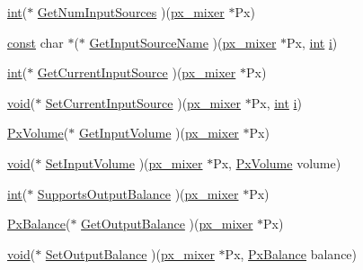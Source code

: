 \begin{DoxyCompactItemize}
\item 
\hyperlink{xmltok_8h_a5a0d4a5641ce434f1d23533f2b2e6653}{int}($\ast$ \hyperlink{structpx__mixer_ab1f16463c72c741b58312db36a7af2e1}{Get\+Num\+Input\+Sources} )(\hyperlink{structpx__mixer}{px\+\_\+mixer} $\ast$Px)
\item 
\hyperlink{getopt1_8c_a2c212835823e3c54a8ab6d95c652660e}{const} char $\ast$($\ast$ \hyperlink{structpx__mixer_a6baf21f3d35d6fa5b2d3a66dd63f3a62}{Get\+Input\+Source\+Name} )(\hyperlink{structpx__mixer}{px\+\_\+mixer} $\ast$Px, \hyperlink{xmltok_8h_a5a0d4a5641ce434f1d23533f2b2e6653}{int} \hyperlink{checksum_8c_ab80e330a3bc9e38c1297fe17381e92b4}{i})
\item 
\hyperlink{xmltok_8h_a5a0d4a5641ce434f1d23533f2b2e6653}{int}($\ast$ \hyperlink{structpx__mixer_a66a47bfc2b37c16f0c3cd6be2bbfc38b}{Get\+Current\+Input\+Source} )(\hyperlink{structpx__mixer}{px\+\_\+mixer} $\ast$Px)
\item 
\hyperlink{sound_8c_ae35f5844602719cf66324f4de2a658b3}{void}($\ast$ \hyperlink{structpx__mixer_a8f44d0008590c9c7697384fbe6451585}{Set\+Current\+Input\+Source} )(\hyperlink{structpx__mixer}{px\+\_\+mixer} $\ast$Px, \hyperlink{xmltok_8h_a5a0d4a5641ce434f1d23533f2b2e6653}{int} \hyperlink{checksum_8c_ab80e330a3bc9e38c1297fe17381e92b4}{i})
\item 
\hyperlink{portmixer_8h_a9353e1a36e40ffe275fbea0105e39dad}{Px\+Volume}($\ast$ \hyperlink{structpx__mixer_a1826ede8dc391816105919490a6ea529}{Get\+Input\+Volume} )(\hyperlink{structpx__mixer}{px\+\_\+mixer} $\ast$Px)
\item 
\hyperlink{sound_8c_ae35f5844602719cf66324f4de2a658b3}{void}($\ast$ \hyperlink{structpx__mixer_a9f837efc2822f28da6f3017d164c72d3}{Set\+Input\+Volume} )(\hyperlink{structpx__mixer}{px\+\_\+mixer} $\ast$Px, \hyperlink{portmixer_8h_a9353e1a36e40ffe275fbea0105e39dad}{Px\+Volume} volume)
\item 
\hyperlink{xmltok_8h_a5a0d4a5641ce434f1d23533f2b2e6653}{int}($\ast$ \hyperlink{structpx__mixer_a1dc7c73c8044cfd954e5489ea67a6a95}{Supports\+Output\+Balance} )(\hyperlink{structpx__mixer}{px\+\_\+mixer} $\ast$Px)
\item 
\hyperlink{portmixer_8h_a77326c5ab2b51d52cb4c2c4b8f023b3c}{Px\+Balance}($\ast$ \hyperlink{structpx__mixer_ad69982cade1ae000bdf80899559529f6}{Get\+Output\+Balance} )(\hyperlink{structpx__mixer}{px\+\_\+mixer} $\ast$Px)
\item 
\hyperlink{sound_8c_ae35f5844602719cf66324f4de2a658b3}{void}($\ast$ \hyperlink{structpx__mixer_a2b8fb01d96e79350014e447494e5671e}{Set\+Output\+Balance} )(\hyperlink{structpx__mixer}{px\+\_\+mixer} $\ast$Px, \hyperlink{portmixer_8h_a77326c5ab2b51d52cb4c2c4b8f023b3c}{Px\+Balance} balance)

\end{DoxyCompactItemize}
